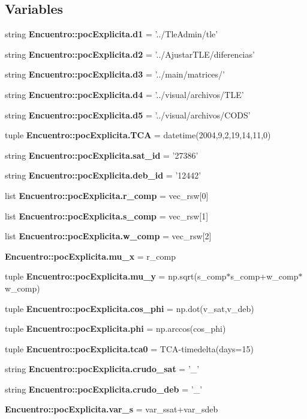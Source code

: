 \subsection*{\-Variables}
\begin{DoxyCompactItemize}
\item 
string {\bf \-Encuentro\-::poc\-Explicita.\-d1} = '../\-Tle\-Admin/tle'
\item 
string {\bf \-Encuentro\-::poc\-Explicita.\-d2} = '../\-Ajustar\-T\-L\-E/diferencias'
\item 
string {\bf \-Encuentro\-::poc\-Explicita.\-d3} = '../main/matrices/'
\item 
string {\bf \-Encuentro\-::poc\-Explicita.\-d4} = '../visual/archivos/\-T\-L\-E'
\item 
string {\bf \-Encuentro\-::poc\-Explicita.\-d5} = '../visual/archivos/\-C\-O\-D\-S'
\item 
tuple {\bf \-Encuentro\-::poc\-Explicita.\-T\-C\-A} = datetime(2004,9,2,19,14,11,0)
\item 
string {\bf \-Encuentro\-::poc\-Explicita.\-sat\-\_\-id} = '27386'
\item 
string {\bf \-Encuentro\-::poc\-Explicita.\-deb\-\_\-id} = '12442'
\item 
list {\bf \-Encuentro\-::poc\-Explicita.\-r\-\_\-comp} = vec\-\_\-rsw[0]
\item 
list {\bf \-Encuentro\-::poc\-Explicita.\-s\-\_\-comp} = vec\-\_\-rsw[1]
\item 
list {\bf \-Encuentro\-::poc\-Explicita.\-w\-\_\-comp} = vec\-\_\-rsw[2]
\item 
{\bf \-Encuentro\-::poc\-Explicita.\-mu\-\_\-x} = r\-\_\-comp
\item 
tuple {\bf \-Encuentro\-::poc\-Explicita.\-mu\-\_\-y} = np.\-sqrt(s\-\_\-comp$\ast$s\-\_\-comp+w\-\_\-comp$\ast$w\-\_\-comp)
\item 
tuple {\bf \-Encuentro\-::poc\-Explicita.\-cos\-\_\-phi} = np.\-dot(v\-\_\-sat,v\-\_\-deb)
\item 
tuple {\bf \-Encuentro\-::poc\-Explicita.\-phi} = np.\-arccos(cos\-\_\-phi)
\item 
tuple {\bf \-Encuentro\-::poc\-Explicita.\-tca0} = \-T\-C\-A-\/timedelta(days=15)
\item 
string {\bf \-Encuentro\-::poc\-Explicita.\-crudo\-\_\-sat} = '\-\_\-'
\item 
string {\bf \-Encuentro\-::poc\-Explicita.\-crudo\-\_\-deb} = '\-\_\-'
\item 
{\bf \-Encuentro\-::poc\-Explicita.\-var\-\_\-s} = var\-\_\-ssat+var\-\_\-sdeb

\end{DoxyCompactItemize}
